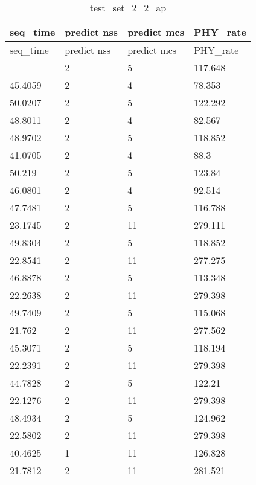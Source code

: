 \documentclass[bwprint]{gmcmthesis}
\begin{document}
\begin{longtable}{llll}
\caption{test\_set\_2\_2\_ap} \\ %
\hline
seq\_time & predict nss & predict mcs & PHY\_rate \\
\hline
\endfirsthead
\hline
seq\_time & predict nss & predict mcs & PHY\_rate \\
\hline
\endhead
\hline
\endfoot
\hline
\endlastfoot
48.399    & 2           & 5           & 117.648   \\
45.4059   & 2           & 4           & 78.353    \\
50.0207   & 2           & 5           & 122.292   \\
48.8011   & 2           & 4           & 82.567    \\
48.9702   & 2           & 5           & 118.852   \\
41.0705   & 2           & 4           & 88.3      \\
50.219    & 2           & 5           & 123.84    \\
46.0801   & 2           & 4           & 92.514    \\
47.7481   & 2           & 5           & 116.788   \\
23.1745   & 2           & 11          & 279.111   \\
49.8304   & 2           & 5           & 118.852   \\
22.8541   & 2           & 11          & 277.275   \\
46.8878   & 2           & 5           & 113.348   \\
22.2638   & 2           & 11          & 279.398   \\
49.7409   & 2           & 5           & 115.068   \\
21.762    & 2           & 11          & 277.562   \\
45.3071   & 2           & 5           & 118.194   \\
22.2391   & 2           & 11          & 279.398   \\
44.7828   & 2           & 5           & 122.21    \\
22.1276   & 2           & 11          & 279.398   \\
48.4934   & 2           & 5           & 124.962   \\
22.5802   & 2           & 11          & 279.398   \\
40.4625   & 1           & 11          & 126.828   \\
21.7812   & 2           & 11          & 281.521   \\

\end{longtable}
\end{document}
